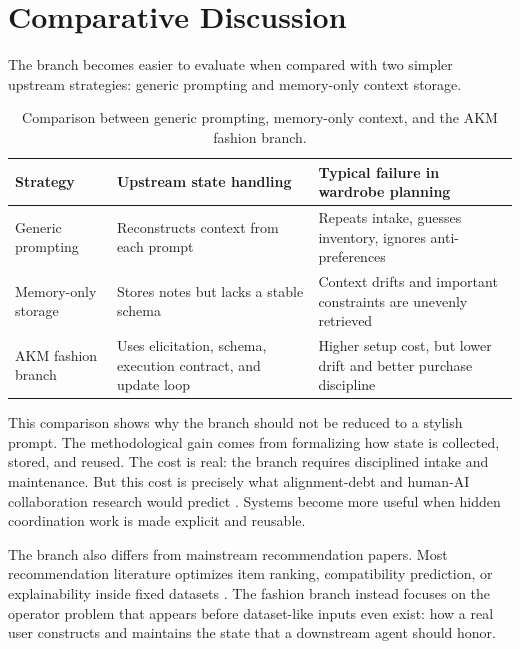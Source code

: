 \documentclass[11pt]{article}
\begin{document}
\section{Comparative Discussion}

The branch becomes easier to evaluate when compared with two simpler upstream strategies: generic prompting and memory-only context storage.

\begin{table}[htbp]
\centering
\small
\begin{tabular}{>{\raggedright\arraybackslash}p{} >{\raggedright\arraybackslash}p{} >{\raggedright\arraybackslash}p{}}
\toprule
Strategy & Upstream state handling & Typical failure in wardrobe planning \\
\midrule
Generic prompting & Reconstructs context from each prompt & Repeats intake, guesses inventory, ignores anti-preferences \\
Memory-only storage & Stores notes but lacks a stable schema & Context drifts and important constraints are unevenly retrieved \\
AKM fashion branch & Uses elicitation, schema, execution contract, and update loop & Higher setup cost, but lower drift and better purchase discipline \\
\bottomrule
\end{tabular}
\caption{Comparison between generic prompting, memory-only context, and the AKM fashion branch.}
\end{table}

This comparison shows why the branch should not be reduced to a stylish prompt. The methodological gain comes from formalizing how state is collected, stored, and reused. The cost is real: the branch requires disciplined intake and maintenance. But this cost is precisely what alignment-debt and human-AI collaboration research would predict \citep{oyemike2025alignment,holstein2025thinking}. Systems become more useful when hidden coordination work is made explicit and reusable.

The branch also differs from mainstream recommendation papers. Most recommendation literature optimizes item ranking, compatibility prediction, or explainability inside fixed datasets \citep{lu2019binarycode,kang2019completelook,lu2021learnableanchors,sarkar2022outfittransformer,li2021personalizedtransformer,cheng2023erra,hsiao2018capsulewardrobes}. The fashion branch instead focuses on the operator problem that appears before dataset-like inputs even exist: how a real user constructs and maintains the state that a downstream agent should honor.
\end{document}
